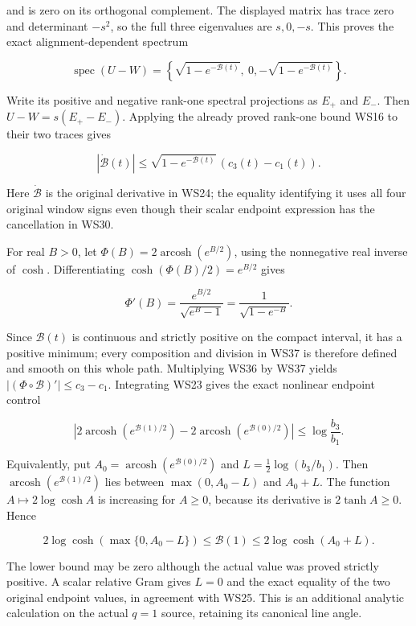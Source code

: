 and is zero on its orthogonal complement. The displayed matrix has trace zero and determinant \(-s^2\), so the full three eigenvalues are \(s,0,-s\). This proves the exact alignment-dependent spectrum

\[
\operatorname{spec}(U-W)
=\left\{\sqrt{1-e^{-\mathcal B(t)}},\ 0,
         -\sqrt{1-e^{-\mathcal B(t)}}\right\}.
\tag{WS35}
\]

Write its positive and negative rank-one spectral projections as \(E_+\) and \(E_-\). Then \(U-W=s(E_+-E_-)\). Applying the already proved rank-one bound WS16 to their two traces gives

\[
|\dot{\mathcal B}(t)|
\le\sqrt{1-e^{-\mathcal B(t)}}\,(c_3(t)-c_1(t)).
\tag{WS36}
\]

Here \(\dot{\mathcal B}\) is the original derivative in WS24; the equality identifying it uses all four original window signs even though their scalar endpoint expression has the cancellation in WS30.

For real \(B>0\), let \(\Phi(B)=2\operatorname{arcosh}(e^{B/2})\), using the nonnegative real inverse of \(\cosh\). Differentiating \(\cosh(\Phi(B)/2)=e^{B/2}\) gives

\[
\Phi'(B)=\frac{e^{B/2}}{\sqrt{e^B-1}}
=\frac1{\sqrt{1-e^{-B}}}.
\tag{WS37}
\]

Since \(\mathcal B(t)\) is continuous and strictly positive on the compact interval, it has a positive minimum; every composition and division in WS37 is therefore defined and smooth on this whole path. Multiplying WS36 by WS37 yields \(|(\Phi\circ\mathcal B)'|\le c_3-c_1\). Integrating WS23 gives the exact nonlinear endpoint control

\[
\boxed{
\left|2\operatorname{arcosh}(e^{\mathcal B(1)/2})
      -2\operatorname{arcosh}(e^{\mathcal B(0)/2})\right|
\le\log\frac{b_3}{b_1}.
}
\tag{WS38}
\]

Equivalently, put \(A_0=\operatorname{arcosh}(e^{\mathcal B(0)/2})\) and \(L=\tfrac12\log(b_3/b_1)\). Then \(\operatorname{arcosh}(e^{\mathcal B(1)/2})\) lies between \(\max(0,A_0-L)\) and \(A_0+L\). The function \(A\mapsto2\log\cosh A\) is increasing for \(A\ge0\), because its derivative is \(2\tanh A\ge0\). Hence

\[
2\log\cosh(\max\{0,A_0-L\})
\le\mathcal B(1)\le2\log\cosh(A_0+L).
\tag{WS39}
\]

The lower bound may be zero although the actual value was proved strictly positive. A scalar relative Gram gives \(L=0\) and the exact equality of the two original endpoint values, in agreement with WS25. This is an additional analytic calculation on the actual \(q=1\) source, retaining its canonical line angle.

